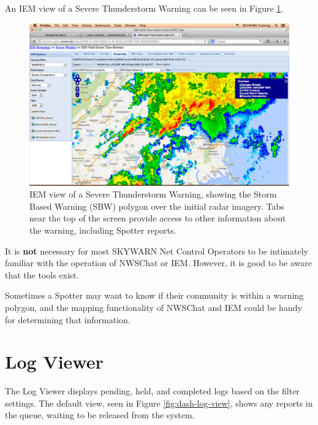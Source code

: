 \documentclass[pdflatex,letterpaper,twoside,12pt]{book}
\begin{document}
An IEM view of a Severe Thunderstorm Warning can be seen in Figure \ref{fig:dash-emwin-iembot}.

\begin{figure}[t]
  \centering
  \includegraphics[width=\textwidth,keepaspectratio=true]{img/dash-emwin-iembot-1}
  \caption{IEM view of a Severe Thunderstorm Warning, showing the Storm Based Warning (SBW) polygon over the initial radar imagery.  Tabs near the top of the screen provide access to other information about the warning, including Spotter reports.\label{fig:dash-emwin-iembot}}
\end{figure}

It is \textbf{not} necessary for most SKYWARN Net Control Operators to be intimately familiar with the operation of NWSChat or IEM.  However, it is good to be aware that the tools exist.

Sometimes a Spotter may want to know if their community is within a warning polygon, and the mapping functionality of NWSChat and IEM could be handy for determining that information.


\section{Log Viewer}\label{dash-log-viewer}

The Log Viewer displays pending, held, and completed logs based on the filter settings.  The default view, seen in Figure \ref{fig:dash-log-view}, shows any reports in the queue, waiting to be released from the system.
\end{document}

